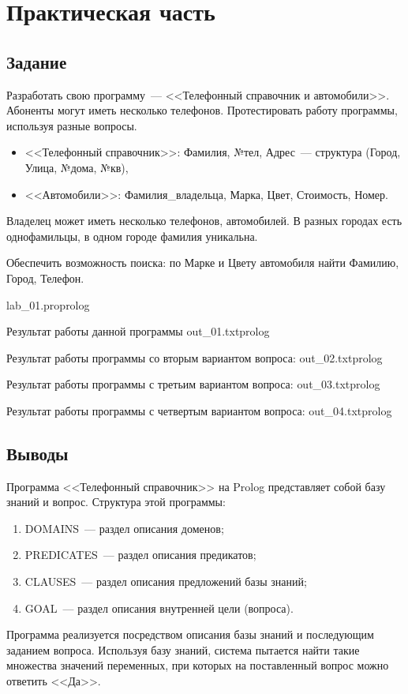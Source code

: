 \chapter{Практическая часть}

\section{Задание}

Разработать свою программу~--- <<Телефонный справочник и автомобили>>.
Абоненты могут иметь несколько телефонов.
Протестировать работу программы, используя разные вопросы.

\begin{itemize}
	\item <<Телефонный справочник>>: Фамилия, №тел, Адрес~--- структура (Город, Улица, №дома, №кв),
	\item <<Автомобили>>: Фамилия\_владельца, Марка, Цвет, Стоимость, Номер.
\end{itemize}
Владелец может иметь несколько телефонов, автомобилей.
В разных городах есть однофамильцы, в одном городе фамилия уникальна.

Обеспечить возможность поиска: по Марке и Цвету автомобиля найти Фамилию, Город, Телефон.

	{lab_01.pro}{prolog}{}

\noindent Результат работы данной программы
	{out_01.txt}{prolog}{}

\noindent Результат работы программы со вторым вариантом вопроса:
	{out_02.txt}{prolog}{}

\noindent Результат работы программы с третьим вариантом вопроса:
	{out_03.txt}{prolog}{}
	
\noindent Результат работы программы с четвертым вариантом вопроса:
	{out_04.txt}{prolog}{}
	
\section{Выводы}

Программа <<Телефонный справочник>> на Prolog представляет собой базу знаний и вопрос.
Структура этой программы:
\begin{enumerate}
	\item DOMAINS~--- раздел описания доменов;
	\item PREDICATES~--- раздел описания предикатов;
	\item CLAUSES~--- раздел описания предложений базы знаний;
	\item GOAL~--- раздел описания внутренней цели (вопроса).
\end{enumerate}

Программа реализуется посредством описания базы знаний и последующим заданием вопроса.
Используя базу знаний, система пытается найти такие множества значений переменных, при которых на поставленный вопрос можно ответить <<Да>>.